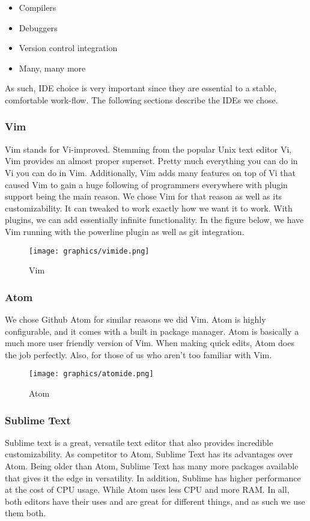 \documentclass[letterpaper, 12pt]{article}
\begin{document}
\begin{itemize}
	\item Compilers
	\item Debuggers
	\item Version control integration
	\item Many, many more
\end{itemize}

As such, IDE choice is very important since they are essential to a stable, comfortable
work-flow. The following sections describe the IDEs we chose.

\subsubsection{Vim}

Vim stands for Vi-improved. Stemming from the popular Unix text editor Vi, Vim
provides an almost proper superset. Pretty much everything you can do in Vi you
can do in Vim. Additionally, Vim adds many features on top of Vi that caused Vim
to gain a huge following of programmers everywhere with plugin support being the main
reason. We chose Vim for that reason as well as its customizability. It can tweaked
to work exactly how we want it to work. With plugins, we can add essentially infinite
functionality. In the figure below, we have Vim running with the powerline plugin as
well as git integration.

\begin{figure}
    \centering
	\texttt{[image: graphics/vimide.png]}
    \caption{Vim}
\end{figure}

\newpage

\subsubsection{Atom}
We chose Github Atom for similar reasons we did Vim. Atom is highly configurable, and it
comes with a built in package manager. Atom is basically a much more user friendly
version of Vim. When making quick edits, Atom does the job perfectly. Also, for
those of us who aren't too familiar with Vim.

\begin{figure}
    \centering
	\texttt{[image: graphics/atomide.png]}
    \caption{Atom}
\end{figure}


\newpage

\subsubsection{Sublime Text}
Sublime text is a great, versatile text editor that also provides incredible customizability.
As competitor to Atom, Sublime Text has its advantages over Atom. Being older than Atom,
Sublime Text has many more packages available that gives it the edge in versatility. In
addition, Sublime has higher performance at the cost of CPU usage. While Atom uses less
CPU and more RAM. In all, both editors have their uses and are great for different things,
and as such we use them both.
\end{document}
